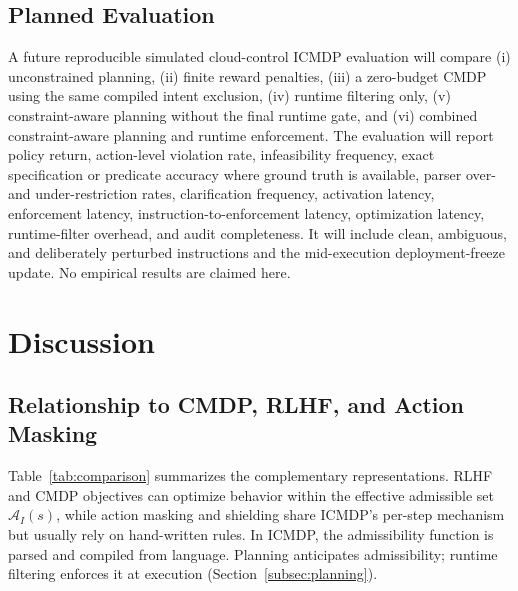\documentclass[journal]{IEEEtran}
\theoremstyle{definition}
\newcommand{\cA}{\mathcal{A}}
\begin{document}
\subsection{Planned Evaluation}
\label{subsec:planned_evaluation}

A future reproducible simulated cloud-control ICMDP evaluation will compare
(i) unconstrained planning, (ii) finite reward penalties, (iii) a zero-budget
CMDP using the same compiled intent exclusion, (iv) runtime filtering only,
(v) constraint-aware planning without the final runtime gate, and (vi) combined
constraint-aware planning and runtime enforcement. The evaluation will report
policy return, action-level violation rate, infeasibility frequency, exact
specification or predicate accuracy where ground truth is available, parser
over- and under-restriction rates, clarification frequency, activation latency,
enforcement latency, instruction-to-enforcement latency, optimization latency,
runtime-filter overhead, and audit completeness. It will
include clean, ambiguous, and deliberately perturbed instructions and the
mid-execution deployment-freeze update. No empirical results are claimed here.

\section{Discussion}
\label{sec:discussion}

\subsection{Relationship to CMDP, RLHF, and Action Masking}
\label{subsec:relationship}

Table~\ref{tab:comparison} summarizes the complementary representations.
RLHF and CMDP objectives can optimize behavior within the effective admissible set
$\cA_I(s)$, while action masking and shielding share ICMDP's per-step
mechanism but usually rely on hand-written rules. In ICMDP, the admissibility
function is parsed and compiled from language. Planning anticipates
admissibility; runtime filtering enforces it at execution
(Section~\ref{subsec:planning}).
\end{document}
